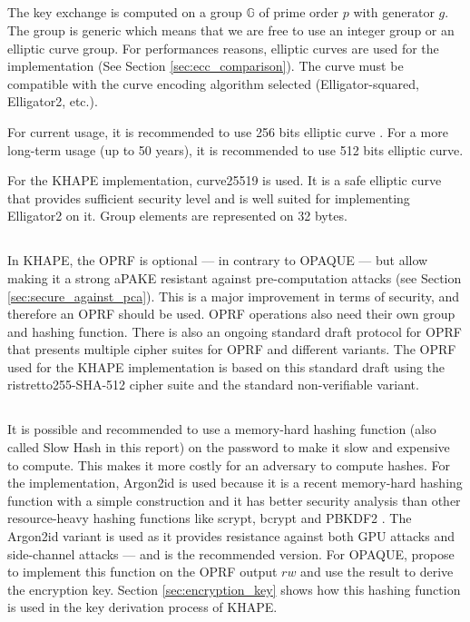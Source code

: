 ﻿\documentclass[../report.tex]{subfiles}
\begin{document}
\subsection{}
The key exchange is computed on a group $\mathbb{G}$ of prime order $p$ with generator $g$.
The group is generic which means that we are free to use an integer group or an elliptic curve group.
For performances reasons, elliptic curves are used for the implementation (See Section \ref{sec:ecc_comparison}).
The curve must be compatible with the curve encoding algorithm selected (Elligator-squared, Elligator2, etc.).

For current usage, it is recommended to use 256 bits elliptic curve \cite{ECRYPT_Keylength}. For a more long-term usage (up to 50 years), it is recommended to use 512 bits elliptic curve.

For the KHAPE implementation, curve25519 is used. It is a safe elliptic curve that provides sufficient security level and is well suited for implementing Elligator2 on it.
Group elements are represented on 32 bytes.


\subsection{} \label{sec:design_choice_oprf}
In KHAPE, the OPRF is optional --- in contrary to OPAQUE --- but allow making it a strong aPAKE resistant against pre-computation attacks (see Section \ref{sec:secure_against_pca}).
This is a major improvement in terms of security, and therefore an OPRF should be used.
OPRF operations also need their own group and hashing function.
There is also an ongoing standard draft protocol for OPRF \cite{VOPRF_Standard_Draft} that presents multiple cipher suites for OPRF and different variants.
The OPRF used for the KHAPE implementation is based on this standard draft using the ristretto255-SHA-512 cipher suite and the standard non-verifiable variant. %


\subsection{} \label{sec:design_choice_slowhash}
It is possible and recommended to use a memory-hard hashing function (also called Slow Hash in this report) on the password to make it slow and expensive to compute. 
This makes it more costly for an adversary to compute hashes.
For the implementation, Argon2id \cite{Argon2_Paper} is used because it is a recent memory-hard hashing function with a simple construction and it has better security analysis than other resource-heavy hashing functions like scrypt, bcrypt and PBKDF2 \cite{CAA}. The Argon2id variant is used as it provides resistance against both GPU attacks and side-channel attacks --- and is the recommended version.
For OPAQUE, \cite{OPAQUE_Standard_Draft} propose to implement this function on the OPRF output $rw$ and use the result to derive the encryption key. Section \ref{sec:encryption_key} shows how this hashing function is used in the key derivation process of KHAPE.
\end{document}
